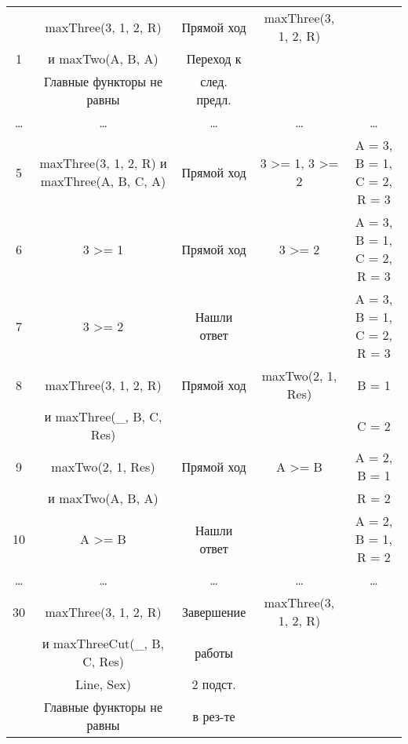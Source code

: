 \begin{landscape}
\begin{longtable}{|c|c|c|c|c|}
        \hline
              & maxThree(3, 1, 2, R) & Прямой ход & maxThree(3, 1, 2, R) & \\
            1 & и maxTwo(A, B, A) & Переход к & &\\
			  & Главные функторы не равны & след. предл. & &\\
			\hline
			\dots & \dots & \dots & \dots & \dots \\
			\hline 
			5 & maxThree(3, 1, 2, R) и maxThree(A, B, C, A) & Прямой ход & 3 >= 1, 3 >= 2 & A = 3, B = 1, C = 2, R = 3\\
            \hline 
			6 & 3 >= 1 & Прямой ход & 3 >= 2  & A = 3, B = 1, C = 2, R = 3\\
            \hline 
			7 & 3 >= 2 & Нашли ответ & & A = 3, B = 1, C = 2, R = 3\\
            \hline 
			8 & maxThree(3, 1, 2, R) & Прямой ход & maxTwo(2, 1, Res) & B = 1\\
              & и maxThree(\_, B, C, Res) & & & C = 2 \\
            \hline 
			9 & maxTwo(2, 1, Res) & Прямой ход & A >= B & A = 2, B = 1\\
              & и maxTwo(A, B, A) & & & R = 2 \\
            \hline 
			10 & A >= B & Нашли ответ & & A = 2, B = 1, R = 2\\
			\hline
			\dots & \dots & \dots & \dots & \dots \\
			\hline
            30  & maxThree(3, 1, 2, R) & Завершение & maxThree(3, 1, 2, R) & \\
              & и maxThreeCut(\_, B, C, Res)& работы & &\\
              & Line, Sex) & 2 подст. & & \\
              & Главные функторы не равны & в рез-те & & \\
    \end{longtable}
\end{landscape}

